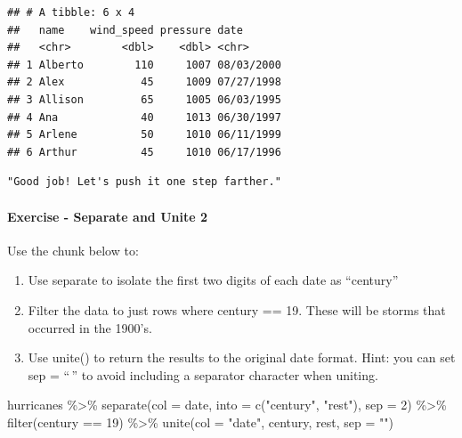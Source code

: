 \documentclass[
]{article}
\newenvironment{Shaded}{\begin{snugshade}}{\end{snugshade}}
\newcommand{\AttributeTok}[1]{\textcolor[rgb]{0.77,0.63,0.00}{#1}}
\newcommand{\DecValTok}[1]{\textcolor[rgb]{0.00,0.00,0.81}{#1}}
\newcommand{\FunctionTok}[1]{\textcolor[rgb]{0.00,0.00,0.00}{#1}}
\newcommand{\NormalTok}[1]{#1}
\newcommand{\SpecialCharTok}[1]{\textcolor[rgb]{0.00,0.00,0.00}{#1}}
\newcommand{\StringTok}[1]{\textcolor[rgb]{0.31,0.60,0.02}{#1}}
\providecommand{\tightlist}{%
  \setlength{\itemsep}{0pt}\setlength{\parskip}{0pt}}
\begin{document}
\begin{verbatim}
## # A tibble: 6 x 4
##   name    wind_speed pressure date      
##   <chr>        <dbl>    <dbl> <chr>     
## 1 Alberto        110     1007 08/03/2000
## 2 Alex            45     1009 07/27/1998
## 3 Allison         65     1005 06/03/1995
## 4 Ana             40     1013 06/30/1997
## 5 Arlene          50     1010 06/11/1999
## 6 Arthur          45     1010 06/17/1996
\end{verbatim}

\begin{verbatim}
"Good job! Let's push it one step farther."
\end{verbatim}

\hypertarget{exercise---separate-and-unite-2}{%
\paragraph{Exercise - Separate and Unite
2}\label{exercise---separate-and-unite-2}}

Use the chunk below to:

\begin{enumerate}
\def\labelenumi{\arabic{enumi}.}
\tightlist
\item
  Use separate to isolate the first two digits of each date as
  ``century''
\item
  Filter the data to just rows where century == 19. These will be storms
  that occurred in the 1900's.
\item
  Use unite() to return the results to the original date format. Hint:
  you can set sep = ``\,'' to avoid including a separator character when
  uniting.
\end{enumerate}

\begin{Shaded}
\begin{Highlighting}[]
\NormalTok{hurricanes }\SpecialCharTok{\%\textgreater{}\%} 
  \FunctionTok{separate}\NormalTok{(}\AttributeTok{col =}\NormalTok{ date, }\AttributeTok{into =} \FunctionTok{c}\NormalTok{(}\StringTok{"century"}\NormalTok{, }\StringTok{"rest"}\NormalTok{), }\AttributeTok{sep =} \DecValTok{2}\NormalTok{) }\SpecialCharTok{\%\textgreater{}\%}
  \FunctionTok{filter}\NormalTok{(century }\SpecialCharTok{==} \DecValTok{19}\NormalTok{) }\SpecialCharTok{\%\textgreater{}\%}
  \FunctionTok{unite}\NormalTok{(}\AttributeTok{col =} \StringTok{"date"}\NormalTok{, century, rest, }\AttributeTok{sep =} \StringTok{""}\NormalTok{)}
\end{Highlighting}
\end{Shaded}
\end{document}
